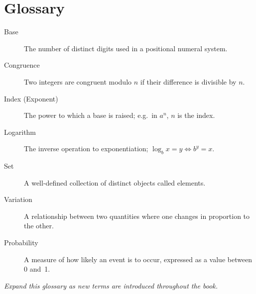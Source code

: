 
\chapter{Glossary}

\begin{description}
    \item[Base] The number of distinct digits used in a positional numeral system.
    \item[Congruence] Two integers are congruent modulo $n$ if their difference is divisible by $n$.
    \item[Index (Exponent)] The power to which a base is raised; e.g.\ in $a^n$, $n$ is the index.
    \item[Logarithm] The inverse operation to exponentiation; $\log_b x = y \iff b^y = x$.
    \item[Set] A well-defined collection of distinct objects called elements.
    \item[Variation] A relationship between two quantities where one changes in proportion to the other.
    \item[Probability] A measure of how likely an event is to occur, expressed as a value between 0 and~1.
\end{description}

\textit{Expand this glossary as new terms are introduced throughout the book.}
